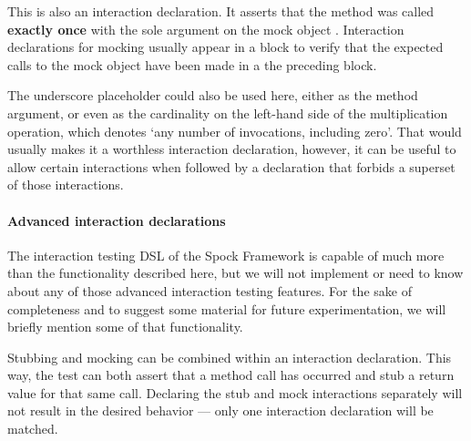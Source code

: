This is also an interaction declaration. It asserts that
the method  was called \textbf{exactly once} with
the sole argument  on
the mock object .
Interaction declarations for mocking usually appear in a  block
to verify that the expected calls to the mock object
have been made in a the preceding  block.

The underscore placeholder could also be used here,
either as the method argument,
or even as the cardinality
on the left-hand side of the multiplication operation,
which denotes `any number of invocations, including zero'.
That would usually makes it a worthless interaction declaration,
however, it can be useful to allow certain interactions when followed by
a declaration that forbids a superset of those interactions.
\autocite[Chapter: Interaction Based Testing - Mocking - Strict Mocking]{SpockFrameworkDoc}

\paragraph{Advanced interaction declarations}
The interaction testing DSL of the Spock Framework
is capable of much more than the functionality described here,
but we will not implement or need to know about any of
those advanced interaction testing features.
For the sake of completeness
and to suggest some material for future experimentation,
we will briefly mention some of that functionality.

Stubbing and mocking can be combined
within an interaction declaration.
This way, the test can both assert that
a method call has occurred and
stub a return value for that same call.
Declaring the stub and mock interactions separately
will not result in the desired behavior ---
only one interaction declaration will be matched.
\autocite[Chapter: Interaction Based Testing - Combining Mocking and Stubbing]{SpockFrameworkDoc}

